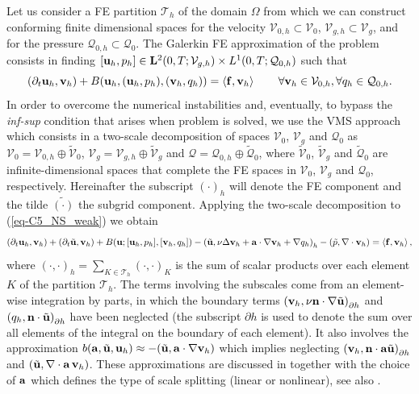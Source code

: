 Let us consider a FE partition $\mathcal{T}_h$ of the domain $\Omega$ from which we can construct conforming finite dimensional spaces for the velocity $\mathcal{V}_{0,h} \subset \mathcal{V}_0$, $\mathcal{V}_{g,h} \subset \mathcal{V}_g$, and for the pressure $\mathcal{Q}_{0,h}\subset \mathcal{Q}_0$. The Galerkin FE approximation of the problem  consists in 
finding $[{\bf u}_h,p_h]\in\mathbf{L}^2(0,T;\mathcal{V}_{g,h})\times L^1(0,T;\mathcal{Q}_{0,h})$ such that
\begin{equation}
\label{eq-C5_NS_galerkin}
(\partial_t{\bf u}_h,{\bf v}_h)+B({\bf u}_h,({\bf u}_h,p_h),({\bf v}_h,q_h)) =\left<{\bf f},{\bf v}_h\right>
\quad\quad\forall{\bf v}_h\in\mathcal{V}_{0,h},\forall q_h\in\mathcal{Q}_{0,h}.
\end{equation}
In order to overcome the numerical instabilities and, eventually, to bypass the \textit{inf-sup} condition that arises when problem  is solved, we use the VMS approach \cite{hughes_multiscale_1995,hughes_variational_1998} which consists in a two-scale decomposition of spaces $\mathcal{V}_0$, $\mathcal{V}_g$ and $\mathcal{Q}_0$ as $\mathcal{V}_0=\mathcal{V}_{0,h}\oplus\widetilde{\mathcal{V}}_0$, $\mathcal{V}_g=\mathcal{V}_{g,h}\oplus\widetilde{\mathcal{V}}_g$ and $\mathcal{Q}=\mathcal{Q}_{0,h}\oplus\widetilde{\mathcal{Q}}_0$, where $\widetilde{\mathcal{V}}_0$, $\widetilde{\mathcal{V}}_g$ and $\widetilde{\mathcal{Q}}_0$ are infinite-dimensional spaces that complete the FE spaces in $\mathcal{V}_0$, $\mathcal{V}_g$ and $\mathcal{Q}_0$, respectively. Hereinafter the subscript $(\cdot)_h$ will denote the FE component and the tilde $\widetilde{(\cdot)}$ the subgrid component. Applying the two-scale decomposition to (\ref{eq-C5_NS_weak}) we obtain
\begin{equation}
\label{eq-C5_NS_vms}
(\partial_t{\bf u}_h,{\bf v}_h)+(\partial_t\tilde{{\bf u}},{\bf v}_h)+B({\bf u};[{\bf u}_h,p_h],[{\bf v}_h,q_h])-\left(\tilde{{\bf u}},\nu\Delta{\bf v}_h+{\bf a}\cdot\nabla{\bf v}_h+\nabla q_h\right)_h-\left(\tilde{p},\nabla\cdot{\bf v}_h\right)=\left<{\bf f},{\bf v}_h\right>,
\end{equation}
where $(\cdot,\cdot)_h=\sum_{K\in\mathcal{T}_h}(\cdot,\cdot)_K$ is the sum of scalar products  over each element $K$ of the partition $\mathcal{T}_h$.
The terms involving the subscales come from an element-wise integration by parts, in which the boundary terms 
$\left( {\bf v}_{h},\nu {\bf n}\cdot \nabla \tilde{{\bf u}}\right)_{\partial h}$ and
$\left( q_{h},{\bf n}\cdot \tilde{{\bf u}}\right)_{\partial h}$
have been neglected (the subscript ${\partial h}$ is used to denote the sum over all elements of the integral on the boundary of each element). It also involves the approximation 
$b({\bf a},\tilde{{\bf u}},{\bf u}_h) \approx -(\tilde{{\bf u}},{\bf a}\cdot\nabla{\bf v}_h)$
which implies neglecting 
$\left( {\bf v}_{h},{\bf n}\cdot {\bf a} \tilde{{\bf u}}\right)_{\partial h}$ and
$(\tilde{{\bf u}},\nabla\cdot{\bf a} \, {\bf v}_h)$. 
These approximations are discussed in  \cite{codina_time_2007} together with the choice of ${\bf a}$ which defines the type of scale splitting (linear or nonlinear), see also \cite{colomes_assessment_2015}.

